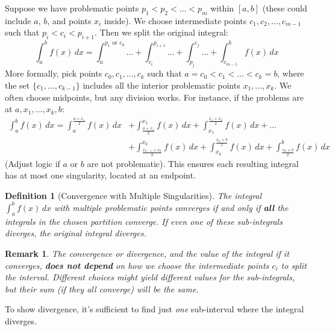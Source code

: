 \documentclass[11pt]{article}
\theoremstyle{mytheoremstyle}
\theoremstyle{mydefinitionstyle}
\newtheorem{definition}[theorem]{Definition}
\newtheorem{remark}[theorem]{Remark}
\begin{document}
Suppose we have problematic points $p_1 < p_2 < \dots < p_m$ within $[a, b]$ (these could include $a$, $b$, and points $x_i$ inside). We choose intermediate points $c_1, c_2, \dots, c_{m-1}$ such that $p_i < c_i < p_{i+1}$. Then we split the original integral:
\[ \int_a^b f(x) \, dx = \int_a^{p_1 \text{ or } c_0} \dots + \int_{c_i}^{p_{i+1}} \dots + \int_{p_j}^{c_j} \dots + \int_{c_{m-1}}^b f(x) \, dx \]
More formally, pick points $c_0, c_1, \dots, c_k$ such that $a = c_0 < c_1 < \dots < c_k = b$, where the set $\{c_1, \dots, c_{k-1}\}$ includes all the interior problematic points $x_1, \dots, x_k$. We often choose midpoints, but any division works. For instance, if the problems are at $a, x_1, \dots, x_k, b$:
\begin{align*} \int_a^b f(x) \, dx = \int_a^{\frac{a+x_1}{2}} f(x) \, dx &+ \int_{\frac{a+x_1}{2}}^{x_1} f(x) \, dx + \int_{x_1}^{\frac{x_1+x_2}{2}} f(x) \, dx + \dots \\ &+ \int_{\frac{x_{k-1}+x_k}{2}}^{x_k} f(x) \, dx + \int_{x_k}^{\frac{x_k+b}{2}} f(x) \, dx + \int_{\frac{x_k+b}{2}}^b f(x) \, dx \end{align*}
(Adjust logic if $a$ or $b$ are not problematic). This ensures each resulting integral has at most one singularity, located at an endpoint.

\begin{definition}[Convergence with Multiple Singularities]
The integral $\int_a^b f(x) \, dx$ with multiple problematic points converges if and only if \textbf{all} the integrals in the chosen partition converge. If even one of these sub-integrals diverges, the original integral diverges.
\end{definition}

\begin{remark}
The convergence or divergence, and the value of the integral if it converges, \textbf{does not depend} on how we choose the intermediate points $c_i$ to split the interval. Different choices might yield different values for the sub-integrals, but their sum (if they all converge) will be the same.
\end{remark}

To show divergence, it's sufficient to find just \emph{one} sub-interval where the integral diverges.
\end{document}
